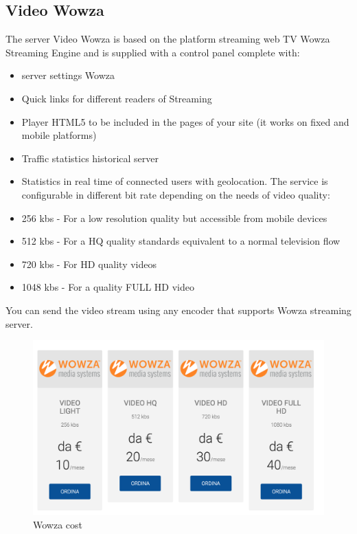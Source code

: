 \newpage 

\subsection{Video Wowza}
\label{sec:Video Wowza}
 The server Video Wowza is based on the platform streaming web TV Wowza Streaming Engine and is supplied with a control panel complete with:
\begin{itemize}

\item server settings Wowza
\item Quick links for different readers of Streaming
\item Player HTML5 to be included in the pages of your site (it works on fixed and mobile platforms)
\item Traffic statistics historical server
\item Statistics in real time of connected users with geolocation. The service is configurable in different bit rate depending on the needs of video quality:
\item 256 kbs - For a low resolution quality but accessible from mobile devices
\item 512 kbs - For a HQ quality standards equivalent to a normal television flow
\item 720 kbs - For HD quality videos
\item 1048 kbs - For a quality FULL HD video
\end{itemize}

You can send the video stream using any encoder that supports Wowza streaming server.


\begin{figure}[!htb]
 \centering
 \includegraphics[width=1.0\linewidth]{images/chapter2/wowza.png}\hfill
 \caption[Wowza cost]{Wowza cost}
 \label{fig:fourV}
\end{figure}

